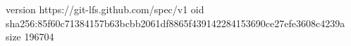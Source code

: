 version https://git-lfs.github.com/spec/v1
oid sha256:85f60c71384157b63bcbb2061df8865f439142284153690ce27efe3608c4239a
size 196704

